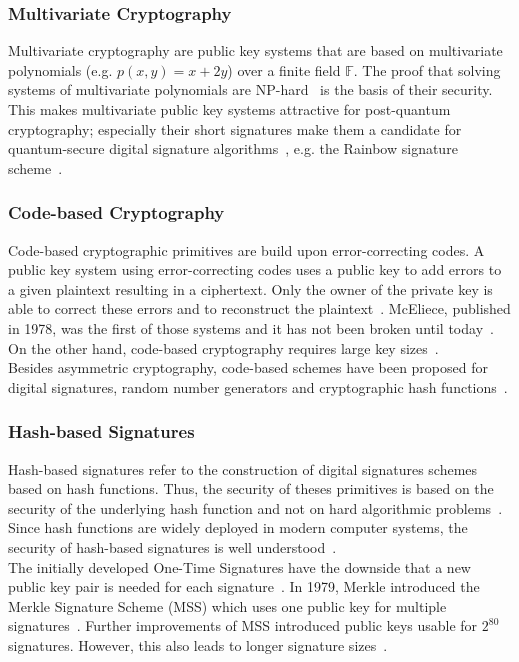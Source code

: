 \subsubsection{Multivariate Cryptography}
Multivariate cryptography are public key systems that are based on multivariate polynomials (e.g. $p(x,y)=x+2y$) over a finite field $\mathbb{F}$. The proof that solving systems of multivariate polynomials are NP-hard~\parencite{hartmanis1982computers} is the basis of their security. This makes multivariate public key systems attractive for post-quantum cryptography; especially their short signatures make them a candidate for quantum-secure digital signature algorithms~\parencite{ding2017current}, e.g. the Rainbow signature scheme~\parencite{ding2005rainbow}.
\subsubsection{Code-based Cryptography}
Code-based cryptographic primitives are build upon error-correcting codes. A public key system using error-correcting codes uses a public key to add errors to a given plaintext resulting in a ciphertext. Only the owner of the private key is able to correct these errors and to reconstruct the plaintext~\parencite{bernstein2017post}. \gls{McEliece}, published in 1978, was the first of those systems and it has not been broken until today~\parencite{mceliece1978public}. On the other hand, code-based cryptography requires large key sizes~\parencite{bernstein2017post}.\\
Besides asymmetric cryptography, code-based schemes have been proposed for digital signatures, random number generators and cryptographic hash functions~\parencite{bernstein2017post}.
\subsubsection{Hash-based Signatures}
Hash-based signatures refer to the construction of digital signatures schemes based on hash functions. Thus, the security of theses primitives is based on the security of the underlying hash function and not on hard algorithmic problems~\parencite{bernstein2017post}. Since hash functions are widely deployed in modern computer systems, the security of hash-based signatures is well understood~\parencite{chen2016report}.\\
The initially developed One-Time Signatures have the downside that a new public key pair is needed for each signature~\parencite{becker2008merkle}. In 1979, Merkle introduced the Merkle Signature Scheme (\gls{MSS}) which uses one public key for multiple signatures~\parencite{merkle1979secrecy}. Further improvements of \gls{MSS} introduced public keys usable for $2^{80}$ signatures. However, this also leads to longer signature sizes~\parencite{becker2008merkle}.


